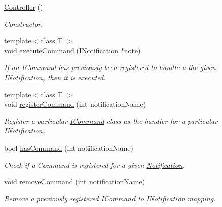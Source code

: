 \begin{DoxyCompactItemize}
\item 
\hyperlink{class_pure_m_v_c_1_1_controller_a95c56822d667e94b031451729ce069a9}{Controller} ()
\begin{DoxyCompactList}\small\item\em Constructor. \item\end{DoxyCompactList}\item 
{\footnotesize template$<$class T $>$ }\\void \hyperlink{class_pure_m_v_c_1_1_controller_ab6508e0255a6b20c70a9abef7ea799cd}{executeCommand} (\hyperlink{class_pure_m_v_c_1_1_i_notification}{INotification} $\ast$note)
\begin{DoxyCompactList}\small\item\em If an {\ttfamily \hyperlink{class_pure_m_v_c_1_1_i_command}{ICommand}} has previously been registered to handle a the given {\ttfamily \hyperlink{class_pure_m_v_c_1_1_i_notification}{INotification}}, then it is executed. \item\end{DoxyCompactList}\item 
{\footnotesize template$<$class T $>$ }\\void \hyperlink{class_pure_m_v_c_1_1_controller_a3e841777e38b7a571aa43aeb9ba40fed}{registerCommand} (int notificationName)
\begin{DoxyCompactList}\small\item\em Register a particular {\ttfamily \hyperlink{class_pure_m_v_c_1_1_i_command}{ICommand}} class as the handler for a particular {\ttfamily \hyperlink{class_pure_m_v_c_1_1_i_notification}{INotification}}. \item\end{DoxyCompactList}\item 
bool \hyperlink{class_pure_m_v_c_1_1_controller_ab434278b9236beb9d5ffb55482233ef9}{hasCommand} (int notificationName)
\begin{DoxyCompactList}\small\item\em Check if a Command is registered for a given \hyperlink{class_pure_m_v_c_1_1_notification}{Notification}. \item\end{DoxyCompactList}\item 
void \hyperlink{class_pure_m_v_c_1_1_controller_a3d6617b86454aad7db4d47d32e692c64}{removeCommand} (int notificationName)
\begin{DoxyCompactList}\small\item\em Remove a previously registered {\ttfamily \hyperlink{class_pure_m_v_c_1_1_i_command}{ICommand}} to {\ttfamily \hyperlink{class_pure_m_v_c_1_1_i_notification}{INotification}} mapping. \item\end{DoxyCompactList}\item 

\end{DoxyCompactItemize}
